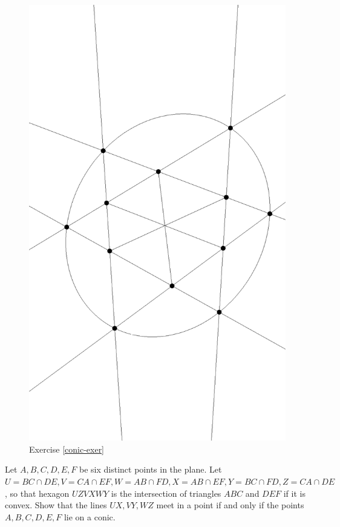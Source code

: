 \begin{figure}[!htb]
\centering
\includegraphics[scale=0.5,angle=270]{conicexer.eps}
\caption{Exercise \ref{conic-exer}}
\end{figure}

\begin{exer}\label{conic-exer} Let $A,B,C,D,E,F$ be six distinct points in the plane. Let $U = BC\cap DE, V = CA\cap EF, W = AB\cap FD, X = AB\cap EF, Y = BC\cap FD, Z = CA\cap DE$, so that hexagon $UZVXWY$ is the intersection of triangles $ABC$ and $DEF$ if it is convex. Show that the lines $UX,VY,WZ$ meet in a point if and only if the points $A,B,C,D,E,F$ lie on a conic.
\end{exer}

